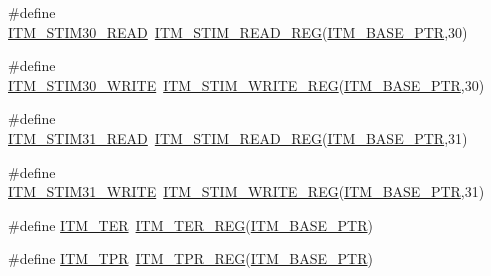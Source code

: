 \begin{DoxyCompactItemize}
\item 
\#define \hyperlink{group___i_t_m___register___accessor___macros_ga24e46238f0f743da6b080a2cbb500ff5}{I\+T\+M\+\_\+\+S\+T\+I\+M30\+\_\+\+R\+E\+AD}~\hyperlink{group___i_t_m___register___accessor___macros_ga5009882336aadcd4f37b45cf3395c450}{I\+T\+M\+\_\+\+S\+T\+I\+M\+\_\+\+R\+E\+A\+D\+\_\+\+R\+EG}(\hyperlink{group___i_t_m___peripheral_gafaddee8fe8b6a898d4e5edc43ee0d703}{I\+T\+M\+\_\+\+B\+A\+S\+E\+\_\+\+P\+TR},30)
\item 
\#define \hyperlink{group___i_t_m___register___accessor___macros_ga04082ae600d9a3012f4c9861fe7d0ea3}{I\+T\+M\+\_\+\+S\+T\+I\+M30\+\_\+\+W\+R\+I\+TE}~\hyperlink{group___i_t_m___register___accessor___macros_ga049ca92a4e78e77c19af81e51aa73f1c}{I\+T\+M\+\_\+\+S\+T\+I\+M\+\_\+\+W\+R\+I\+T\+E\+\_\+\+R\+EG}(\hyperlink{group___i_t_m___peripheral_gafaddee8fe8b6a898d4e5edc43ee0d703}{I\+T\+M\+\_\+\+B\+A\+S\+E\+\_\+\+P\+TR},30)
\item 
\#define \hyperlink{group___i_t_m___register___accessor___macros_ga6643b5b69131aa2163f02c7d27c2305c}{I\+T\+M\+\_\+\+S\+T\+I\+M31\+\_\+\+R\+E\+AD}~\hyperlink{group___i_t_m___register___accessor___macros_ga5009882336aadcd4f37b45cf3395c450}{I\+T\+M\+\_\+\+S\+T\+I\+M\+\_\+\+R\+E\+A\+D\+\_\+\+R\+EG}(\hyperlink{group___i_t_m___peripheral_gafaddee8fe8b6a898d4e5edc43ee0d703}{I\+T\+M\+\_\+\+B\+A\+S\+E\+\_\+\+P\+TR},31)
\item 
\#define \hyperlink{group___i_t_m___register___accessor___macros_gab792df922db5e627bc1d9917ff6b4ac2}{I\+T\+M\+\_\+\+S\+T\+I\+M31\+\_\+\+W\+R\+I\+TE}~\hyperlink{group___i_t_m___register___accessor___macros_ga049ca92a4e78e77c19af81e51aa73f1c}{I\+T\+M\+\_\+\+S\+T\+I\+M\+\_\+\+W\+R\+I\+T\+E\+\_\+\+R\+EG}(\hyperlink{group___i_t_m___peripheral_gafaddee8fe8b6a898d4e5edc43ee0d703}{I\+T\+M\+\_\+\+B\+A\+S\+E\+\_\+\+P\+TR},31)
\item 
\#define \hyperlink{group___i_t_m___register___accessor___macros_ga18c94f3236b7d64c83e63cdd586e5e9b}{I\+T\+M\+\_\+\+T\+ER}~\hyperlink{group___i_t_m___register___accessor___macros_ga0952675d3a89701dd186427f1c52c919}{I\+T\+M\+\_\+\+T\+E\+R\+\_\+\+R\+EG}(\hyperlink{group___i_t_m___peripheral_gafaddee8fe8b6a898d4e5edc43ee0d703}{I\+T\+M\+\_\+\+B\+A\+S\+E\+\_\+\+P\+TR})
\item 
\#define \hyperlink{group___i_t_m___register___accessor___macros_ga4a106555b6d58115c86e09d48e199572}{I\+T\+M\+\_\+\+T\+PR}~\hyperlink{group___i_t_m___register___accessor___macros_gaae645266e2d2ce5b4085486432dee954}{I\+T\+M\+\_\+\+T\+P\+R\+\_\+\+R\+EG}(\hyperlink{group___i_t_m___peripheral_gafaddee8fe8b6a898d4e5edc43ee0d703}{I\+T\+M\+\_\+\+B\+A\+S\+E\+\_\+\+P\+TR})

\end{DoxyCompactItemize}
